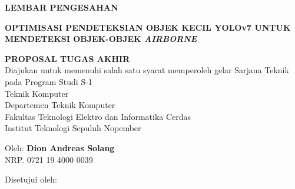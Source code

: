 \begin{center}
	\large
  \textbf{LEMBAR PENGESAHAN}
\end{center}

\thispagestyle{empty}

\begin{center}
  \textbf{OPTIMISASI PENDETEKSIAN OBJEK KECIL YOLOv7 UNTUK MENDETEKSI OBJEK-OBJEK \emph{AIRBORNE}}
\end{center}

\begingroup
  \small

  \begin{center}
    \textbf{PROPOSAL TUGAS AKHIR} \\
    Diajukan untuk memenuhi salah satu syarat memperoleh gelar Sarjana Teknik pada Program Studi S-1 \\
    Teknik Komputer \\
    Departemen Teknik Komputer \\
    Fakultas Teknologi Elektro dan Informatika Cerdas \\
    Institut Teknologi Sepuluh Nopember
  \end{center}

  \vspace{4ex}

  \begin{center}
    Oleh: \textbf{Dion Andreas Solang} \\
    NRP. 0721 19 4000 0039
  \end{center}

  \vspace{4ex}

  \begin{center}
    Disetujui oleh:
  \end{center}
  \vspace{6em}

  \begingroup
    \setlength{\tabcolsep}{0pt}

